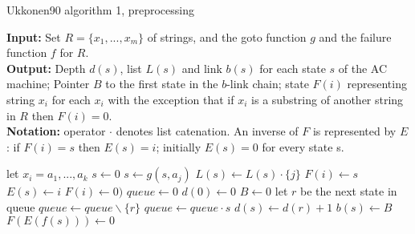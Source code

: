 \documentclass[english,twoside,censored,csm,algorithms-track-2020]{HYthesisML}
\theoremstyle{plain}
\theoremstyle{definition}
\begin{document}
  
  

  \begin{algorithm}[h]

    \caption{Ukkonen90 algorithm 1, preprocessing} \label{ukk-pre}
    \hspace*{\algorithmicindent} \textbf{Input:} Set $R=\{x_1,...,x_m\}$ of strings, and the goto function $g$ and the failure function $f$ for $R$.\\
    \hspace*{\algorithmicindent} \textbf{Output:} Depth $d(s)$, list $L(s)$ and link $b(s)$ for each state $s$ of the AC machine; Pointer $B$ to the first state in the $b$-link chain; state $F(i)$ representing string $x_i$ for each $x_i$ with the exception that if $x_i$ is a substring of another string in $R$ then $F(i) = 0$.\\
    \hspace*{\algorithmicindent} \textbf{Notation:} operator $\cdot$ denotes list catenation. An inverse of $F$ is represented by $E$: if $F(i) = s$ then $E(s) = i$; initially $E(s) = 0$ for every state s.\\
    
    \begin{algorithmic}[1]
          \hspace*{\algorithmicindent} let $x_i = a_1,...,a_k$
          \State $s\gets 0$
            \State $s\gets g(s,a_j)$
            \State $L(s)\gets L(s) \cdot \{j\}$
              \State $F(i)\gets s$
              \State $E(s)\gets i$
                \State $F(i)\gets 0)$
              \EndIf
            \EndIf
          \EndFor
        \EndFor
        \State $queue\gets 0$
        \State $d(0)\gets 0$
        \State $B\gets 0$
          \hspace*{\algorithmicindent} let $r$ be the next state in queue
          \State $queue\gets queue \backslash \{r\}$
            \State $queue\gets queue\cdot s$
            \State $d(s)\gets d(r)+1$
            \State $b(s)\gets B$
            \State $F(E(f(s)))\gets 0$
          \EndFor
        \EndWhile
      \EndFunction
        
    \end{algorithmic}
  \end{algorithm}
\end{document}
